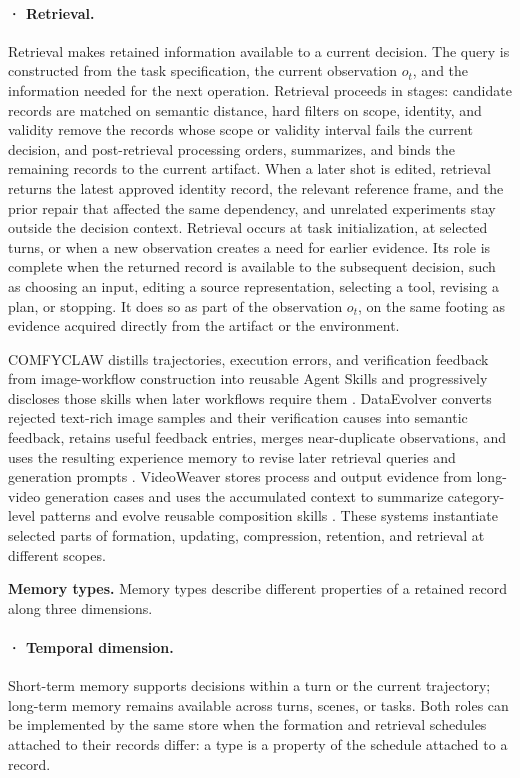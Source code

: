 \paragraph{· Retrieval.} Retrieval makes retained information available to a current decision. The query is constructed from the task specification, the current observation $o_t$, and the information needed for the next operation. Retrieval proceeds in stages: candidate records are matched on semantic distance, hard filters on scope, identity, and validity remove the records whose scope or validity interval fails the current decision, and post-retrieval processing orders, summarizes, and binds the remaining records to the current artifact. When a later shot is edited, retrieval returns the latest approved identity record, the relevant reference frame, and the prior repair that affected the same dependency, and unrelated experiments stay outside the decision context. Retrieval occurs at task initialization, at selected turns, or when a new observation creates a need for earlier evidence. Its role is complete when the returned record is available to the subsequent decision, such as choosing an input, editing a source representation, selecting a tool, revising a plan, or stopping. It does so as part of the observation $o_t$, on the same footing as evidence acquired directly from the artifact or the environment.

COMFYCLAW distills trajectories, execution errors, and verification feedback from image-workflow construction into reusable Agent Skills and progressively discloses those skills when later workflows require them \cite{avg260701709}. DataEvolver converts rejected text-rich image samples and their verification causes into semantic feedback, retains useful feedback entries, merges near-duplicate observations, and uses the resulting experience memory to revise later retrieval queries and generation prompts \cite{avg260631537}. VideoWeaver stores process and output evidence from long-video generation cases and uses the accumulated context to summarize category-level patterns and evolve reusable composition skills \cite{avg260608091}. These systems instantiate selected parts of formation, updating, compression, retention, and retrieval at different scopes.

\textbf{Memory types.} Memory types describe different properties of a retained record along three dimensions.

\paragraph{· Temporal dimension.} Short-term memory supports decisions within a turn or the current trajectory; long-term memory remains available across turns, scenes, or tasks. Both roles can be implemented by the same store when the formation and retrieval schedules attached to their records differ: a type is a property of the schedule attached to a record.

